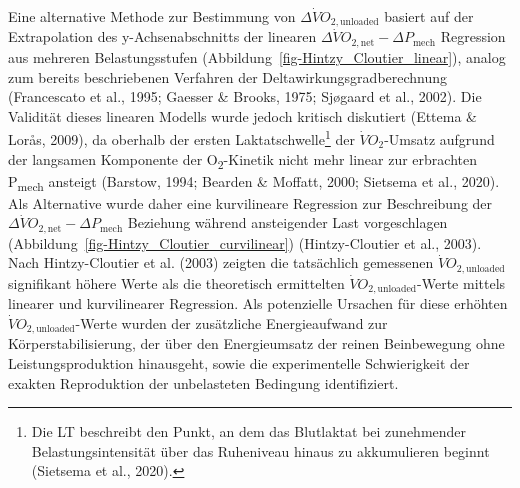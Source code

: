 \documentclass[
  letterpaper,
  DIV=11]{scrartcl}
\begin{document}
Eine alternative Methode zur Bestimmung von
\(\Delta\dot{V}O_{2,\text{unloaded}}\) basiert auf der Extrapolation des
y-Achsenabschnitts der linearen
\(\Delta\dot{V}O_{2,\text{net}} - \Delta P_{\text{mech}}\) Regression
aus mehreren Belastungsstufen
(Abbildung~\ref{fig-Hintzy_Cloutier_linear}), analog zum bereits
beschriebenen Verfahren der Deltawirkungsgradberechnung (Francescato et
al., 1995; Gaesser \& Brooks, 1975; Sjøgaard et al., 2002). Die
Validität dieses linearen Modells wurde jedoch kritisch diskutiert
(Ettema \& Lorås, 2009), da oberhalb der ersten
Laktatschwelle\footnote{Die LT beschreibt den Punkt, an dem das
  Blutlaktat bei zunehmender Belastungsintensität über das Ruheniveau
  hinaus zu akkumulieren beginnt (Sietsema et al., 2020).} der
\(\dot{V}O_2\)-Umsatz aufgrund der langsamen Komponente der
O\textsubscript{2}-Kinetik nicht mehr linear zur erbrachten
P\textsubscript{mech} ansteigt (Barstow, 1994; Bearden \& Moffatt, 2000;
Sietsema et al., 2020). Als Alternative wurde daher eine kurvilineare
Regression zur Beschreibung der
\(\Delta\dot{V}O_{2,\text{net}} - \Delta P_{\text{mech}}\) Beziehung
während ansteigender Last vorgeschlagen
(Abbildung~\ref{fig-Hintzy_Cloutier_curvilinear}) (Hintzy-Cloutier et
al., 2003). Nach Hintzy-Cloutier et al. (2003) zeigten die tatsächlich
gemessenen \(\dot{V}O_{2,\text{unloaded}}\) signifikant höhere Werte als
die theoretisch ermittelten \(\dot{V}O_{2,\text{unloaded}}\)-Werte
mittels linearer und kurvilinearer Regression. Als potenzielle Ursachen
für diese erhöhten \(\dot{V}O_{2,\text{unloaded}}\)-Werte wurden der
zusätzliche Energieaufwand zur Körperstabilisierung, der über den
Energieumsatz der reinen Beinbewegung ohne Leistungsproduktion
hinausgeht, sowie die experimentelle Schwierigkeit der exakten
Reproduktion der unbelasteten Bedingung identifiziert.
\end{document}
